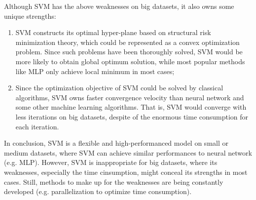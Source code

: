 \documentclass[12pt,a4paper]{article}
\theoremstyle{definition}
\begin{document}
Although SVM has the above weaknesses on big datasets, it also owns some unique strengths:

\begin{enumerate}
	\item SVM constructs its optimal hyper-plane based on structural risk minimization theory, which could be represented as a convex optimization problem. Since such problems have been thoroughly solved, SVM would be more likely to obtain global optimum solution, while most popular methods like MLP only achieve local minimum in most cases;
	
	\item Since the optimization objective of SVM could be solved by classical algorithms, SVM owns faster convergence velocity than neural network and some other machine learning algorithms. That is, SVM would converge with less iterations on big datasets, despite of the enormous time consumption for each iteration.
\end{enumerate}

In conclusion, SVM is a flexible and high-performanced model on small or medium datasets, where SVM can achieve similar performances to neural network (e.g. MLP). However, SVM is inappropriate for big datasets, where its weaknesses, especially the time cinsumption, might conceal its strengths in most cases. Still, methods to make up for the weaknesses are being constantly developed (e.g. parallelization to optimize time consumption).
\end{document}
